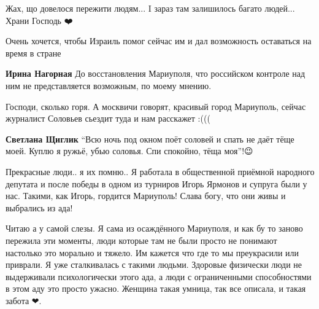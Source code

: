  
 
 
 
 

\qqSecCmt


Жах, що довелося пережити людям... I зараз там залишилось багато людей... Храни Господь ❤️


Очень хочется, чтобы Израиль помог сейчас им и дал возможность оставаться на время в стране

\begin{itemize} %
\textbf{Ирина Нагорная} До восстановления Мариуполя, что российском контроле над ним не представляется возможным, по моему мнению.
\end{itemize} %


Господи, сколько горя. А москвичи говорят, красивый город Мариуполь, сейчас
журналист Соловьев сьездит туда и нам расскажет :(((

\begin{itemize} %
\textbf{Светлана Щиглик} \enquote{Всю ночь под окном поёт соловей и спать не даёт тёще моей. Куплю я ружьё, убью соловья. Спи спокойно, тёща моя}!😉
\end{itemize} %


Прекрасные люди.. я их помню.. Я работала в общественной приёмной народного
депутата и после победы в одном из турниров Игорь Ярмонов и супруга были у нас.
Такими, как Игорь, гордится Мариуполь! Слава богу, что они живы и выбрались из
ада!


Читаю а у самой слезы. Я сама из осаждённого Мариуполя, и как бу то заново
пережила эти моменты, люди которые там не были просто не понимают настолько это
морально и тяжело. Им кажется что где то мы преукрасили или приврали. Я уже
сталкивалась с такими людьми. Здоровые физически люди не выдерживали
психологически этого ада, а люди с ограниченными способностями в этом аду это
просто ужасно. Женщина такая умница, так все описала, и такая забота ❤.

